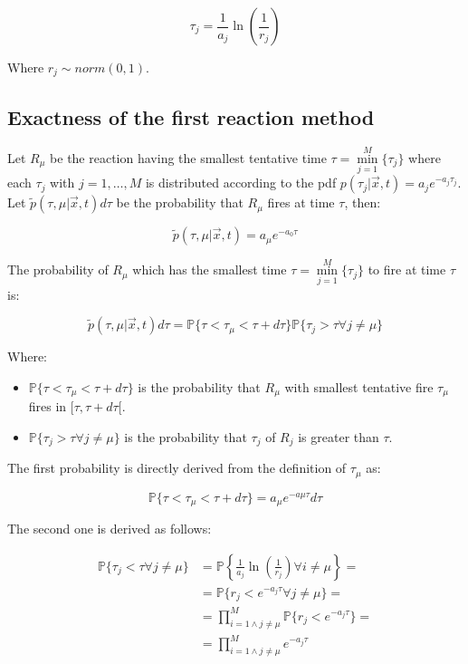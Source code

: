   $$\tau_j = \frac{1}{a_j}\ln\left(\frac{1}{r_j}\right)$$

  Where $r_j\sim norm(0,1)$.

  \subsection{Exactness of the first reaction method}
  Let $R_\mu$ be the reaction having the smallest tentative time $\tau = \min\limits_{j=1}^M\{\tau_j\}$ where each $\tau_j$ with $j = 1, \dots, M$ is distributed according to the pdf $p(\tau_j| \vec{x}, t) = a_je^{-a_j\tau_j}$.
  Let $\tilde{p}(\tau, \mu|\vec{x}, t)d\tau$ be the probability that $R_\mu$ fires at time $\tau$, then:

  $$\tilde{p}(\tau,\mu|\vec{x},t) = a_\mu e^{-a_0\tau}$$

  The probability of $R_\mu$ which has the smallest time $\tau = \min\limits_{j=1}^M\{\tau_j\}$ to fire at time $\tau$ is:

  $$\tilde{p}(\tau,\mu|\vec{x},t)d\tau = \mathbb{P}\{\tau<\tau_\mu<\tau+d\tau\}\mathbb{P}\{\tau_j>\tau\forall j\neq\mu\}$$

  Where:

  \begin{multicols}{2}
    \begin{itemize}
      \item $\mathbb{P}\{\tau<\tau_\mu<\tau+d\tau\}$ is the probability that $R_\mu$ with smallest tentative fire $\tau_\mu$ fires in $[\tau, \tau+d\tau[$.
      \item $\mathbb{P}\{\tau_j>\tau\forall j\neq\mu\}$ is the probability that $\tau_j$ of $R_j$ is greater than $\tau$.
    \end{itemize}
  \end{multicols}

  The first probability is directly derived from the definition of $\tau_\mu$ as:

  $$\mathbb{P}\{\tau<\tau_\mu<\tau+d\tau\} = a_\mu e^{-a\mu\tau}d\tau$$

  The second one is derived as follows:

  \begin{align*}
    \mathbb{P}\{\tau_j<\tau\forall j\neq\mu\} &= \mathbb{P}\left\{\frac{1}{a_j}\ln\left(\frac{1}{r_j}\right)\forall i\neq\mu\right\}=\\
                                              &=\mathbb{P}\{r_j<e^{-a_j\tau}\forall j\neq \mu\}=\\
                                              &=\prod\limits_{i=1\land j\neq\mu}^M\mathbb{P}\{r_j<e^{-a_j\tau}\}=\\
                                              &=\prod\limits_{i=1\land j\neq\mu}^M e^{-a_j\tau}
  \end{align*}


